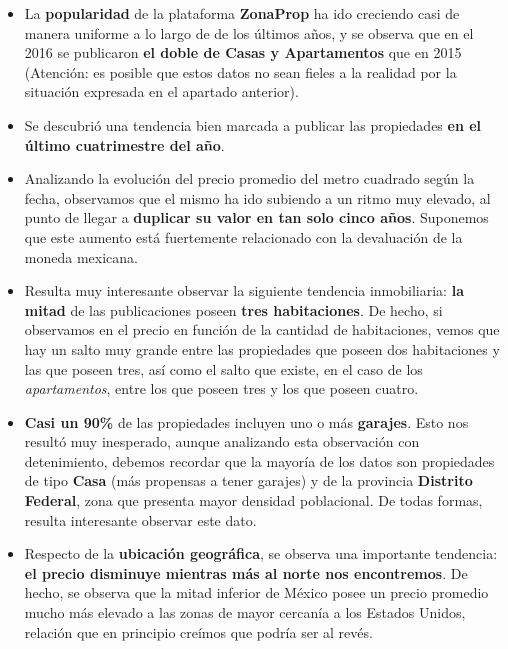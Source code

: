 \documentclass[
10pt, %
a4paper, %
oneside, %
headinclude,footinclude, %
BCOR5mm, %
]{scrartcl}
\begin{document}
    \begin{itemize}
        \item La \textbf{popularidad} de la plataforma \textbf{ZonaProp} ha ido creciendo casi de manera uniforme a lo largo de de los últimos años, y se observa que en el 2016 se publicaron \textbf{el doble de Casas y Apartamentos} que en 2015 (Atenci\'on: es posible que estos datos no sean fieles a la realidad por la situaci\'on expresada en el apartado anterior).
        
        \item Se descubri\'o una tendencia bien marcada a publicar las propiedades \textbf{en el \'ultimo cuatrimestre del año}. 
        
        \item Analizando la evoluci\'on del precio promedio del metro cuadrado seg\'un la fecha, observamos que el mismo ha ido subiendo a un ritmo muy elevado, al punto de llegar a \textbf{duplicar su valor en tan solo cinco años}. Suponemos que este aumento est\'a fuertemente relacionado con la devaluaci\'on de la moneda mexicana.
        
        \item Resulta muy interesante observar la siguiente tendencia inmobiliaria: \textbf{la mitad} de las publicaciones poseen \textbf{tres habitaciones}. De hecho, si observamos en el precio en funci\'on de la cantidad de habitaciones, vemos que hay un salto muy grande entre las propiedades que poseen dos habitaciones y las que poseen tres, as\'i como el salto que existe, en el caso de los \textit{apartamentos}, entre los que poseen tres y los que poseen cuatro.
        
        \item \textbf{Casi un 90\%} de las propiedades incluyen uno o m\'as \textbf{garajes}. Esto nos result\'o muy inesperado, aunque analizando esta observaci\'on con detenimiento, debemos recordar que la mayor\'ia de los datos son propiedades de tipo \textbf{Casa} (m\'as propensas a tener garajes) y de la provincia \textbf{Distrito Federal}, zona que presenta mayor densidad poblacional. De todas formas, resulta interesante observar este dato.
        
        \item Respecto de la \textbf{ubicaci\'on geogr\'afica}, se observa una importante tendencia: \textbf{el precio disminuye mientras m\'as al norte nos encontremos}. De hecho, se observa que la mitad inferior de M\'exico posee un precio promedio mucho m\'as elevado a las zonas de mayor cercan\'ia a los Estados Unidos, relaci\'on que en principio cre\'imos que podr\'ia ser al rev\'es.
        

\end{itemize}
\end{document}

